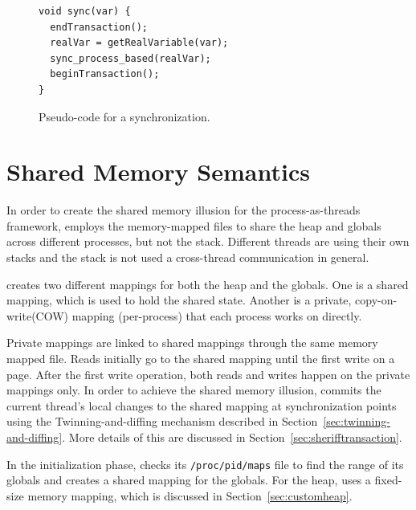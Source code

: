 \begin{figure}[!t]
\small
\begin{lstlisting}[style=tt]
void sync(var) {
  endTransaction();
  realVar = getRealVariable(var);
  sync_process_based(realVar);	
  beginTransaction();
}
\end{lstlisting}
\caption{Pseudo-code for a synchronization.\label{fig:synccode}}
\end{figure}

\section{Shared Memory Semantics}
\label{sec:sharedmemory}

In order to create the shared memory illusion for the process-as-threads framework, \sheriff{} employs the memory-mapped files to share the heap and globals across different processes, but not the stack. Different threads are using their own stacks and the stack is not used a cross-thread communication in general.

\sheriff{} creates two different mappings for both the heap and the globals. One is a shared mapping, which is used to hold the shared state. Another is a private, copy-on-write(COW) mapping (per-process) that each process works on directly.

Private mappings are linked to shared mappings through the same memory mapped file. Reads initially go to the shared mapping until the first write on a page. After the first write operation, both reads and writes happen on the private mappings only. In order to achieve the shared memory illusion, \sheriff{} commits the current thread's local changes to the shared mapping at synchronization points using the Twinning-and-diffing mechanism described in Section~\ref{sec:twinning-and-diffing}. More details of this are discussed in Section~\ref{sec:sherifftransaction}.

In the initialization phase, \sheriff{} checks its \texttt{/proc/pid/maps} file to find the range of its globals and creates a shared mapping for the globals. For the heap, \sheriff{} uses a fixed-size memory mapping, which is discussed in Section~\ref{sec:customheap}. 

